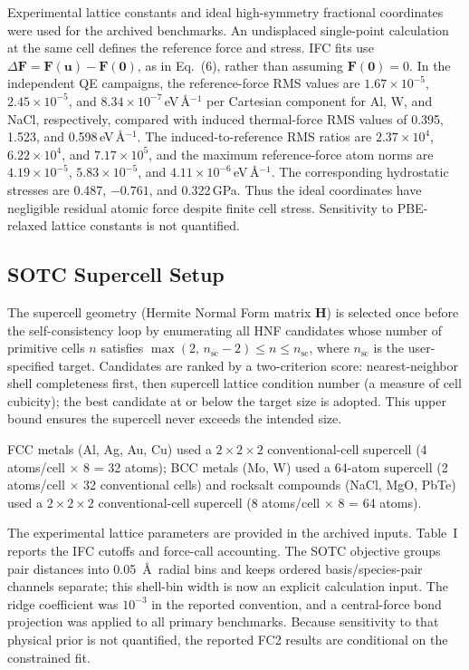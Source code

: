 \documentclass[aps,prb,reprint,amsmath,amssymb,floatfix]{revtex4-2}
\begin{document}
Experimental lattice constants and ideal high-symmetry fractional coordinates
were used for the archived benchmarks. An undisplaced single-point calculation
at the same cell defines the reference force and stress. IFC fits use
\(\Delta\mathbf F=\mathbf F(\mathbf u)-\mathbf F(\mathbf0)\), as in Eq.~(6),
rather than assuming \(\mathbf F(\mathbf0)=0\). In the independent QE campaigns,
the reference-force RMS values are \(1.67\times10^{-5}\),
\(2.45\times10^{-5}\), and \(8.34\times10^{-7}\)\,eV\,\AA\(^{-1}\) per
Cartesian component for Al, W, and NaCl, respectively, compared with induced
thermal-force RMS values of 0.395, 1.523, and 0.598\,eV\,\AA\(^{-1}\).
The induced-to-reference RMS ratios are \(2.37\times10^4\),
\(6.22\times10^4\), and \(7.17\times10^5\), and the maximum
reference-force atom norms are \(4.19\times10^{-5}\),
\(5.83\times10^{-5}\), and \(4.11\times10^{-6}\)\,eV\,\AA\(^{-1}\).
The corresponding hydrostatic stresses are 0.487, \(-0.761\), and
0.322\,GPa. Thus the ideal coordinates have negligible residual atomic force
despite finite cell stress. Sensitivity to PBE-relaxed lattice constants is not
quantified.

\subsection{SOTC Supercell Setup}\label{sotc-supercell-setup}

The supercell geometry (Hermite Normal Form matrix \(\mathbf{H}\)) is
selected once before the self-consistency loop by enumerating all HNF
candidates whose number of primitive cells \(n\) satisfies
\(\max(2,\,n_\text{sc}-2) \le n \le n_\text{sc}\), where
\(n_\text{sc}\) is the user-specified target. Candidates are ranked by a
two-criterion score: nearest-neighbor shell completeness first, then
supercell lattice condition number (a measure of cell cubicity); the best candidate at or below the
target size is adopted. This upper bound ensures the supercell never
exceeds the intended size.

FCC metals (Al, Ag, Au, Cu) used a \(2\times2\times2\) conventional-cell
supercell (4 atoms/cell \(\times\) 8 = 32 atoms); BCC metals (Mo, W)
used a 64-atom supercell (2 atoms/cell \(\times\) 32 conventional cells)
and rocksalt compounds (NaCl, MgO, PbTe) used a \(2\times2\times2\)
conventional-cell supercell (8 atoms/cell \(\times\) 8 = 64 atoms).

The experimental lattice parameters are provided in the archived inputs.
Table~I reports the IFC cutoffs and force-call accounting. The SOTC objective
groups pair distances into 0.05~\AA\ radial bins and keeps ordered
basis/species-pair channels separate; this shell-bin width is now an explicit
calculation input. The ridge coefficient was \(10^{-3}\) in the reported
convention, and a central-force
bond projection was applied to all primary benchmarks. Because sensitivity to
that physical prior is not quantified, the reported FC2 results are conditional
on the constrained fit.
\end{document}
